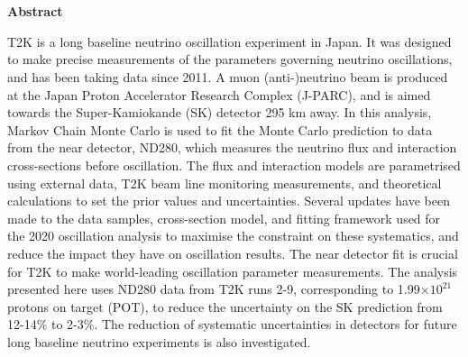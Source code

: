 \chapter{}

\begin{center}
\textbf{Abstract} 
\newline
\end{center}

T2K is a long baseline neutrino oscillation experiment in Japan. It was designed to make precise measurements of the parameters governing neutrino oscillations, and has been taking data since 2011. A muon (anti-)neutrino beam is produced at the Japan Proton Accelerator Research Complex (J-PARC), and is aimed towards the Super-Kamiokande (SK) detector 295 km away. In this analysis, Markov Chain Monte Carlo is used to fit the Monte Carlo prediction to data from the near detector, ND280, which measures the neutrino flux and interaction cross-sections before oscillation. The flux and interaction models are parametrised using external data, T2K beam line monitoring measurements, and theoretical calculations to set the prior values and uncertainties. Several updates have been made to the data samples, cross-section model, and fitting framework used for the 2020 oscillation analysis to maximise the constraint on these systematics, and reduce the impact they have on oscillation results. The near detector fit is crucial for T2K to make world-leading oscillation parameter measurements. The analysis presented here uses ND280 data from T2K runs 2-9, corresponding to 1.99$\times10^{21}$ protons on target (POT), to reduce the uncertainty on the SK prediction from 12-14$\%$ to 2-3$\%$. The reduction of systematic uncertainties in detectors for future long baseline neutrino experiments is also investigated. 


\newpage
